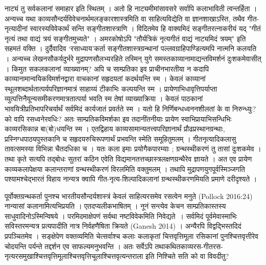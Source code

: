 {\dev नाट्यं तु सर्वकलानां समाहार इति स्थितम् । अतो हि नाट्यमीमांसावसरे सर्वापि कलाभाविती त्वन्तर्हिता । अन्यच्च यथा काव्यसौन्दर्यविवेचनार्थमलङ्कारशास्त्रमिति वा साहित्यविद्येति वा ज्ञानशाखाऽस्ति, तथैव गीत-नृत्यादीनां स्वारस्यविवेकार्थं सन्ति सङ्गीतशास्त्राणि । विदितमेव हि वाक्यमिदं सङ्गीतरत्नाकरीयं यद् "गीतं नृत्यं तथा वाद्यं त्रयं सङ्गीतमुच्यते" । अमरकोषोऽपि "तौर्यत्रिकं नृत्यगीतं वाद्यं नाट्यमिदं त्रयम्" इति सहमतं वक्ति । दुर्दैवादिव ‘रसाध्याय’कर्ता सङ्गीतशास्त्रग्रन्थानां पल्लवग्राहिपाण्डित्यमपि नात्मनि कलयति । अन्यच्च लेखनसौकर्यदुर्भरे मुद्रापणसौलभ्यरहिते तस्मिन् युगे समस्तकाव्यानामाद्यन्तविमर्शनं दुःशकमेवासीत् । किमुत सकलकलानां व्याख्यानम्? अपि च साम्प्रतिका इव प्राचीनभारतीया न कदापि काव्यानामा\-न्वयिकविमर्शनद्वारा वाचकानां सहृदयतां कदर्थयन्ति स्म । केवलं काव्यानां स्थूलशब्दार्थता\-त्पर्यपरिज्ञानमात्रं साहाय्यं टीकाभिः कल्पयन्ति स्म । प्रायेणाभिधावृत्तिपर्याप्ता व्युत्पत्तिनैयून्य\-समीकरणमात्रतात्पर्या भवति स्म तेषां व्याख्याक्रिया । केवलं पाठकानां भावयित्रीप्रतिभापरि\-चर्यार्थं सर्वमिदं कार्यजातं प्रवर्तते स्म । यतो हि निर्णिबन्धध्वननशीलतां के वा निरुन्ध्युः? को वापि रसध्वनेरवधिः? अतः साम्प्रतिकविमर्शका इव तदानींतनीयाः प्रायेण स्वाभिप्रायाभि\-सन्धिभिः काव्यरसिकान्न बा(बो)धयन्ति स्म । एतद्विहाय काव्यसामान्यतत्त्वपरिज्ञानार्थं प्रौढप्रस्थानग्रन्थाः, प्रस्निग्धपाठ्यपुस्तकानि च सहृदयरुचिरूपणार्थं प्रभवन्ति स्मेति समूहितुमलम् । गीतनृत्यादिकलासु तावत्समस्या विभिन्ना चैतदधिका च । यतः कला इमाः प्रयोगैकपारम्याः ; ग्रन्थस्थीकरणं तु तासां दुःशकमेव । तथा कृते सत्यपि तद्बोधः सुतरां कठिन एवेति विद्यमानतत्तच्छास्त्रलक्षणग्रन्थैरेव ज्ञायते । अत एव प्रायेण काव्यकलापेक्षया कलान्तराणां ग्रन्थस्थीकरणं विरलमिति वक्तुमलम् । तथापि मुद्रापणयुगपूर्वस्मिञ्जगति पश्यामश्चेद्भारतं विहाय नान्यत्र क्वापि गीत-नृत्य-शिल्पादिकलानां ग्रन्थस्थीकरणमियति प्रमाणे दरीदृश्यते ।}

{\dev पूर्वोक्तग्रन्थकर्ता पुनश्च भारतीयसौन्दर्यशास्त्रं केवलं साहित्यरसमेव रसत्वेन मनुते} (Pollock 2016:24)  {\dev नान्यासां कलानामित्यभिप्रयति । एतदप्यलीकभाषितम् । नूनं सन्त्येव केचन साम्प्रतिकास्तस्य साधुवादिनोऽस्मिन्विषये । परमिदमाक्षेपणं सर्वथा नष्टविवेकमिति निवेद्यते~। सर्वमिदं पूर्वमेवास्माभिः सविस्तरमन्यत्र प्रत्यपादीति नात्र निर्वहणैषिता क्रियते} (Ganesh 2014) {\dev । अन्यैरपि विद्वद्भिस्तदिदं प्रपञ्चितमेव । सङ्क्षेपेण वक्तव्यमिति चेत्सर्वाश्च कलाः कला\-कृतां चित्तवृत्तिमूला रसिकानां पुनश्चित्तवृत्तीरेव चोदयन्ति पर्यन्ते तद्दर्शन एव साफल्यमनु\-भवन्ति । अतः सर्वेऽपि तथाकथितकाव्यरस-गीतरस-नृत्यरसमुखाश्चित्तवृत्तिमूलाश्चित्तवृत्ति\-चूलाश्चित्तवृत्यन्तराला इति निश्चिते सति को वा विवदीतु?}

